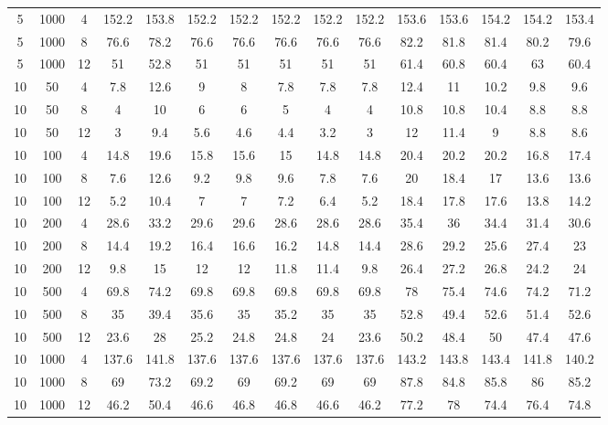 \documentclass[review,3p,times,authoryear,12pt]{elsarticle}
\begin{document}
\begin{table}[!htbp]
\begin{tabular}{ccccccccccccccc}
    5     & 1000  & 4     & 152.2 & 153.8 & 152.2 & 152.2 & 152.2 & 152.2 & 152.2 & 153.6 & 153.6 & 154.2 & 154.2 & 153.4 \\
    5     & 1000  & 8     & 76.6  & 78.2  & 76.6  & 76.6  & 76.6  & 76.6  & 76.6  & 82.2  & 81.8  & 81.4  & 80.2  & 79.6 \\
    5     & 1000  & 12    & 51    & 52.8  & 51    & 51    & 51    & 51    & 51    & 61.4  & 60.8  & 60.4  & 63    & 60.4 \\
    10    & 50    & 4     & 7.8   & 12.6  & 9     & 8     & 7.8   & 7.8   & 7.8   & 12.4  & 11    & 10.2  & 9.8   & 9.6 \\
    10    & 50    & 8     & 4     & 10    & 6     & 6     & 5     & 4     & 4     & 10.8  & 10.8  & 10.4  & 8.8   & 8.8 \\
    10    & 50    & 12    & 3     & 9.4   & 5.6   & 4.6   & 4.4   & 3.2   & 3     & 12    & 11.4  & 9     & 8.8   & 8.6 \\
    10    & 100   & 4     & 14.8  & 19.6  & 15.8  & 15.6  & 15    & 14.8  & 14.8  & 20.4  & 20.2  & 20.2  & 16.8  & 17.4 \\
    10    & 100   & 8     & 7.6   & 12.6  & 9.2   & 9.8   & 9.6   & 7.8   & 7.6   & 20    & 18.4  & 17    & 13.6  & 13.6 \\
    10    & 100   & 12    & 5.2   & 10.4  & 7     & 7     & 7.2   & 6.4   & 5.2   & 18.4  & 17.8  & 17.6  & 13.8  & 14.2 \\
    10    & 200   & 4     & 28.6  & 33.2  & 29.6  & 29.6  & 28.6  & 28.6  & 28.6  & 35.4  & 36    & 34.4  & 31.4  & 30.6 \\
    10    & 200   & 8     & 14.4  & 19.2  & 16.4  & 16.6  & 16.2  & 14.8  & 14.4  & 28.6  & 29.2  & 25.6  & 27.4  & 23 \\
    10    & 200   & 12    & 9.8   & 15    & 12    & 12    & 11.8  & 11.4  & 9.8   & 26.4  & 27.2  & 26.8  & 24.2  & 24 \\
    10    & 500   & 4     & 69.8  & 74.2  & 69.8  & 69.8  & 69.8  & 69.8  & 69.8  & 78    & 75.4  & 74.6  & 74.2  & 71.2 \\
    10    & 500   & 8     & 35    & 39.4  & 35.6  & 35    & 35.2  & 35    & 35    & 52.8  & 49.4  & 52.6  & 51.4  & 52.6 \\
    10    & 500   & 12    & 23.6  & 28    & 25.2  & 24.8  & 24.8  & 24    & 23.6  & 50.2  & 48.4  & 50    & 47.4  & 47.6 \\
    10    & 1000  & 4     & 137.6 & 141.8 & 137.6 & 137.6 & 137.6 & 137.6 & 137.6 & 143.2 & 143.8 & 143.4 & 141.8 & 140.2 \\
    10    & 1000  & 8     & 69    & 73.2  & 69.2  & 69    & 69.2  & 69    & 69    & 87.8  & 84.8  & 85.8  & 86    & 85.2 \\
    10    & 1000  & 12    & 46.2  & 50.4  & 46.6  & 46.8  & 46.8  & 46.6  & 46.2  & 77.2  & 78    & 74.4  & 76.4  & 74.8 \\

    \hline
    \end{tabular}
  \label{tab:2}
\end{table}
\end{document}
